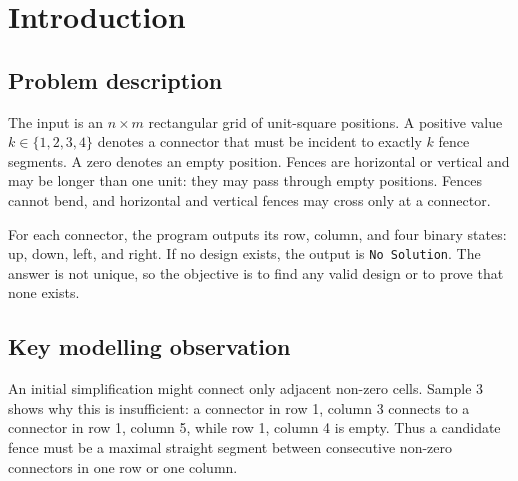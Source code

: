 \documentclass[11pt,a4paper,oneside]{article}
\begin{document}
\setcounter{tocdepth}{1}
\clearpage
\tableofcontents
\clearpage
{}

\section{Introduction}

\subsection{Problem description}

The input is an $n\times m$ rectangular grid of unit-square positions. A positive
value $k\in\{1,2,3,4\}$ denotes a connector that must be incident to exactly $k$
fence segments. A zero denotes an empty position. Fences are horizontal or
vertical and may be longer than one unit: they may pass through empty positions.
Fences cannot bend, and horizontal and vertical fences may cross only at a
connector.

For each connector, the program outputs its row, column, and four binary states:
up, down, left, and right. If no design exists, the output is
\texttt{No Solution}. The answer is not unique, so the objective is to find any
valid design or to prove that none exists.

\subsection{Key modelling observation}

An initial simplification might connect only adjacent non-zero cells. Sample 3
shows why this is insufficient: a connector in row 1, column 3 connects to a
connector in row 1, column 5, while row 1, column 4 is empty. Thus a candidate
fence must be a maximal straight segment between consecutive non-zero
connectors in one row or one column.
\end{document}
